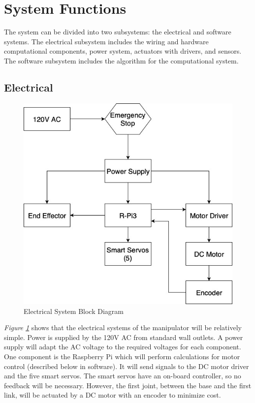 \documentclass[12pt]{report}
\begin{document}
\section{System Functions}
The system can be divided into two subsystems: the electrical and software systems. The electrical subsystem includes the wiring and hardware computational components, power system, actuators with drivers, and sensors. The software subsystem includes the algorithm for the computational system.
\subsection{Electrical}

\begin{figure}[htp]
  \centering
  \includegraphics[width=.55\textwidth]{eblock}
  \caption{Electrical System Block Diagram}
  \label{fig:eblock}
\end{figure}

\emph{Figure \ref{fig:eblock}} shows that the electrical systems of the manipulator will be relatively simple. Power is supplied by the 120V AC from standard wall outlets. A power supply will adapt the AC voltage to the required voltages for each component. One component is the Raspberry Pi which will perform calculations for motor control (described below in software). It will send signals to the DC motor driver and the five smart servos. The smart servos have an on-board controller, so no feedback will be necessary. However, the first joint, between the base and the first link, will be actuated by a DC motor with an encoder to minimize cost.
\end{document}
